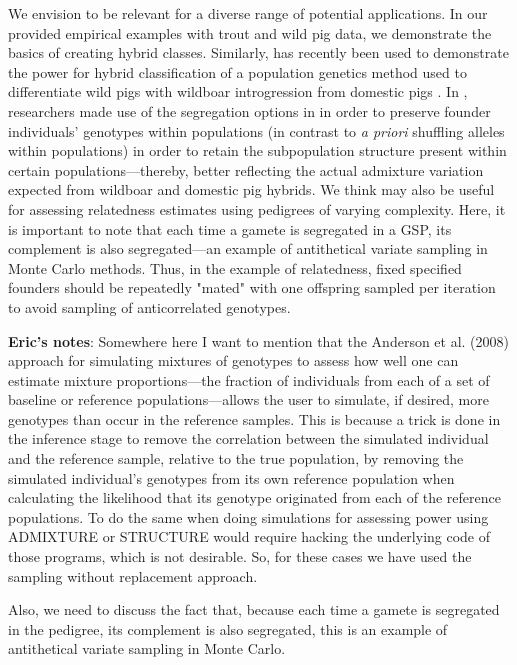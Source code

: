 {We envision \gscramble{} to be relevant for a diverse range of potential applications. In our 
provided empirical examples with trout and wild pig data, we demonstrate the basics of 
creating hybrid classes. Similarly, \gscramble{} has recently been used to demonstrate the 
power for hybrid classification of a population genetics method used to differentiate wild pigs with 
wildboar introgression from domestic pigs \citep{smyser2024probgen}. In \citet{smyser2024probgen}, 
researchers made use of the segregation options in \gscramble{} in order to preserve founder individuals' 
genotypes within populations (in contrast to \textit{a priori} shuffling alleles within populations) in order to 
retain the subpopulation structure present within certain populations---thereby, better reflecting the 
actual admixture variation expected from wildboar and domestic pig hybrids. We think \gscramble{} 
may also be useful for assessing relatedness estimates using pedigrees of varying complexity. Here, it 
is important to note that each time a gamete is segregated in a GSP, its complement is also 
segregated---an example of antithetical variate sampling in Monte Carlo methods. Thus, in the 
example of relatedness, fixed specified founders should be repeatedly "mated" with one offspring 
sampled per iteration to avoid sampling of anticorrelated genotypes.

\textbf{Eric's notes}: 
Somewhere here I want to mention that the Anderson et al. (2008) approach for simulating
mixtures of genotypes to assess how well one can estimate mixture proportions---the fraction
of individuals from each of a set of baseline or reference populations---allows the user to
simulate, if desired, more genotypes than occur in the reference samples.  This is because
a trick is done in the inference stage to remove the correlation between the simulated individual
and the reference sample, relative to the true population, by removing the simulated individual's
genotypes from its own reference population when calculating the likelihood that its genotype
originated from each of the reference populations.  To do the same when doing simulations for
assessing power using ADMIXTURE or STRUCTURE would require hacking the underlying code
of those programs, which is not desirable.  So, for these cases we have used the sampling
without replacement approach.

Also, we need to discuss the fact that, because each time a gamete is segregated in the
pedigree, its complement is also segregated, this is an example of antithetical variate sampling
in Monte Carlo.  

}
